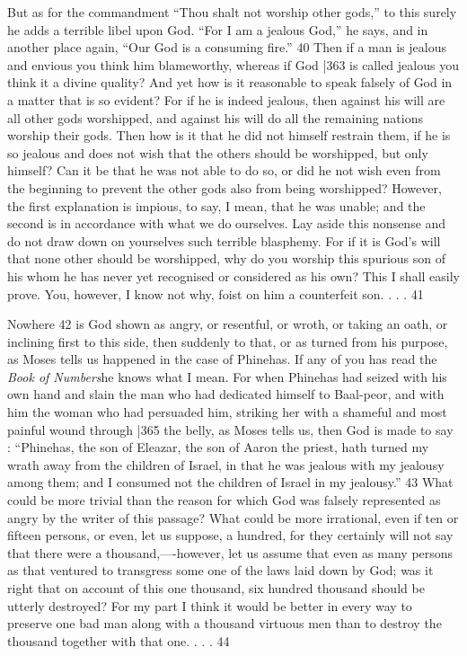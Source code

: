 But as for the commandment ``Thou shalt not worship other gods,'' to this surely he adds a terrible libel upon God. ``For I am a jealous God,'' he says, and in another place again, ``Our God is a consuming fire.''
40 Then if a man is jealous and envious you think him blameworthy, whereas if God
|363 is called jealous you think it a divine quality? And yet how is it reasonable to speak falsely of God in a matter that is so evident? For if he is indeed jealous, then against his will are all other gods worshipped, and against his will do all the remaining nations worship their gods. Then how is it that he did not himself restrain them, if he is so jealous and does not wish that the others should be worshipped, but only himself? Can it be that he was not able to do so, or did he not wish even from the beginning to prevent the other gods also from being worshipped? However, the first explanation is impious, to
say, I mean, that he was unable; and the second is in accordance with what we do ourselves. Lay aside this nonsense and do not draw down on yourselves such terrible blasphemy. For if it is God's will that none other should be worshipped, why do you worship this spurious son of his whom he has never yet recognised or considered as his own? This I shall easily prove. You, however, I know not why, foist on him a counterfeit son. . . . 41

Nowhere 42 is God shown as angry, or resentful, or wroth, or taking an oath, or inclining first to this side, then suddenly to that, or as turned from his purpose, as Moses tells us happened in the case of Phinehas. If any of you has read the \emph{Book of Numbers}he knows what I mean. For when Phinehas had seized with his own hand and slain the man who had dedicated himself to Baal-peor, and with him the woman who had persuaded him, striking her with a shameful and most painful wound through
|365 the belly, as Moses tells us, then God is made to say : ``Phinehas, the son of Eleazar, the son of Aaron the priest, hath turned my wrath away from the children of Israel, in that he was jealous with my jealousy among them; and I consumed not the children of Israel in my jealousy.''
43 What could be more trivial than the reason for which God was falsely represented as angry by the writer of this passage? What could be more irrational, even if ten or fifteen persons, or even, let us suppose, a hundred, for they certainly will not say that there were a thousand,----however, let us assume that even as many persons as that ventured to transgress some one of the laws laid down by God; was it right that on account of this one thousand, six hundred thousand should be utterly destroyed? For my part I think it would be better in every way to preserve one bad man along with a thousand virtuous men than to destroy the thousand together with that one. . . . 44

